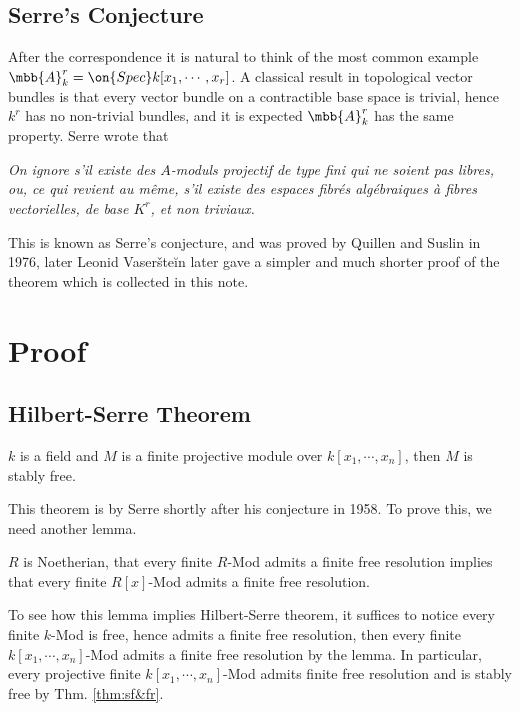 \subsection{Serre's Conjecture}
After the correspondence it is natural to think of the most common example $\mbb{A}^r_k=\on{Spec}k[x_1,\cdots,x_r]$. A classical result in topological vector bundles is that every vector bundle on a contractible base space is trivial, hence $k^r$ has no non-trivial bundles, and it is expected $\mbb{A}^r_k$ has the same property. Serre wrote that

\textit{On ignore s'il existe des $A$-moduls projectif de type fini qui ne soient pas libres, ou, ce qui revient au même, s'il existe des espaces fibrés algébraiques à fibres vectorielles, de base $K^r$, et non triviaux.}

This is known as Serre's conjecture, and was proved by Quillen and Suslin in 1976, later Leonid Vaseršteĭn later gave a simpler and much shorter proof of the theorem which is collected in this note.

\section{Proof}
\subsection{Hilbert-Serre Theorem}
\begin{thm}
	$k$ is a field and $M$ is a finite projective module over $k[x_1,\cdots,x_n]$, then $M$ is stably free.
\end{thm}
This theorem is by Serre\cite{Serre1958} shortly after his conjecture in 1958. To prove this, we need another lemma.
\begin{lem}\label{lem:PreHSthm}
	$R$ is Noetherian, that every finite $R$-Mod admits a finite free resolution implies that every finite $R[x]$-Mod admits a finite free resolution.
\end{lem}
To see how this lemma implies Hilbert-Serre theorem, it suffices to notice every finite $k$-Mod is free, hence admits a finite free resolution, then every finite $k[x_1,\cdots,x_n]$-Mod admits a finite free resolution by the lemma. In particular, every projective finite $k[x_1,\cdots,x_n]$-Mod admits finite free resolution and is stably free by Thm. \ref{thm:sf&fr}.

